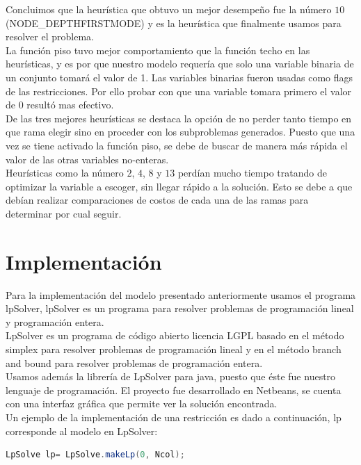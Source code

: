 \documentclass[10pt]{article}
\begin{document}
Concluimos que la heurística que obtuvo un mejor desempeño fue la número $10$ (NODE\_DEPTHFIRSTMODE) y es la heurística que finalmente usamos para resolver el problema.\\

La función piso tuvo mejor comportamiento que la función techo en las heurísticas, y es por que nuestro modelo requería que solo una variable binaria de un conjunto tomará el 
valor de 1. Las variables binarias fueron usadas como flags de las restricciones. Por ello probar con que una variable tomara primero el valor de $0$ resultó mas efectivo. \\

De las tres mejores heurísticas se destaca la opción de no perder tanto tiempo en que rama elegir sino en proceder con los subproblemas generados. Puesto que una vez se tiene activado
la función piso, se debe de buscar de manera más rápida el valor de las otras variables no-enteras.\\

Heurísticas como la número $2$, $4$, $8$ y $13$ perdían mucho tiempo tratando de optimizar la variable a escoger, sin llegar rápido a la solución. Esto se debe a que debían realizar
comparaciones de costos de cada una de las ramas para determinar por cual seguir.\\


\section{Implementaci\'on}

Para la implementaci\'on del modelo presentado anteriormente usamos el programa lpSolver, lpSolver es un programa para resolver problemas de programación lineal y programación entera.\\

LpSolver es un programa de código abierto licencia LGPL basado en el método simplex para resolver problemas de programación lineal y en el método branch and bound para resolver problemas de programaci\'on entera.\\

Usamos además la librería de LpSolver para java, puesto que éste fue nuestro lenguaje de programación. El proyecto fue desarrollado en Netbeans, se cuenta con una interfaz gráfica que permite
ver la solución encontrada.\\

Un ejemplo de la implementación de una restricción es dado a continuación, lp corresponde al modelo en LpSolver:\\
\begin{lstlisting}[language=Java]
LpSolve lp= LpSolve.makeLp(0, Ncol);
\end{lstlisting}
\end{document}
